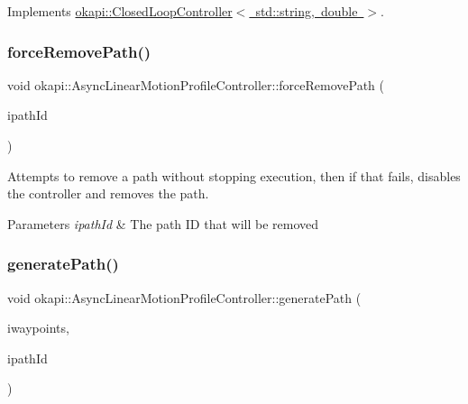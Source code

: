 Implements \mbox{\hyperlink{classokapi_1_1ClosedLoopController_a768cd1db40ce9cd5c89b20be6e838ccc}{okapi\+::\+Closed\+Loop\+Controller$<$ std\+::string, double $>$}}.

\mbox{\label{classokapi_1_1AsyncLinearMotionProfileController_a59582a155943d96d5f6be9c06cfbf704}} 
\subsubsection{\texorpdfstring{forceRemovePath()}{forceRemovePath()}}
{\footnotesize\ttfamily void okapi\+::\+Async\+Linear\+Motion\+Profile\+Controller\+::force\+Remove\+Path (\begin{DoxyParamCaption}\item[{const std\+::string \&}]{ipath\+Id }\end{DoxyParamCaption})}

Attempts to remove a path without stopping execution, then if that fails, disables the controller and removes the path.


\begin{DoxyParams}{Parameters}
{\em ipath\+Id} & The path ID that will be removed \\
\hline
\end{DoxyParams}
\mbox{\label{classokapi_1_1AsyncLinearMotionProfileController_aef2acba51417d929695ca38e309b0f6c}} 
\subsubsection{\texorpdfstring{generatePath()}{generatePath()}\hspace{0.1cm}{\footnotesize\ttfamily [1/2]}}
{\footnotesize\ttfamily void okapi\+::\+Async\+Linear\+Motion\+Profile\+Controller\+::generate\+Path (\begin{DoxyParamCaption}\item[{std\+::initializer\+\_\+list$<$ Q\+Length $>$}]{iwaypoints,  }\item[{const std\+::string \&}]{ipath\+Id }\end{DoxyParamCaption})}

